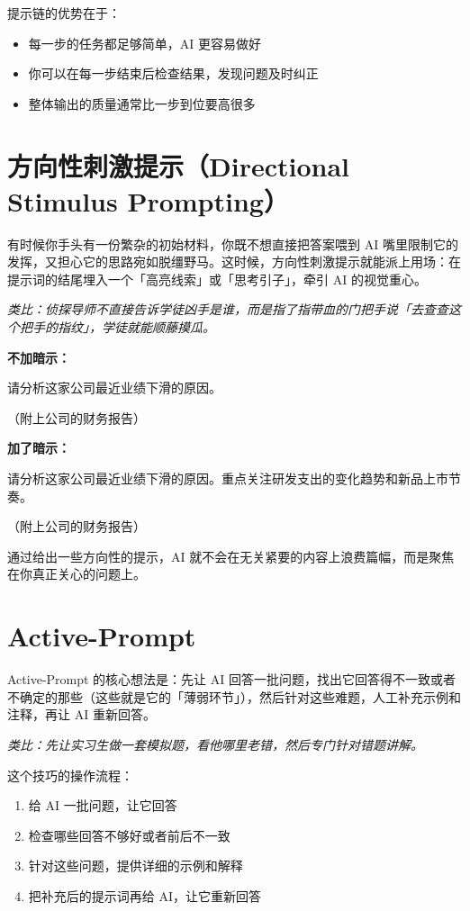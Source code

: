 提示链的优势在于：

\begin{itemize}
  \item 每一步的任务都足够简单，AI 更容易做好
  \item 你可以在每一步结束后检查结果，发现问题及时纠正
  \item 整体输出的质量通常比一步到位要高很多
\end{itemize}

\section{方向性刺激提示（Directional Stimulus Prompting）}

有时候你手头有一份繁杂的初始材料，你既不想直接把答案喂到 AI 嘴里限制它的发挥，又担心它的思路宛如脱缰野马。这时候，方向性刺激提示就能派上用场：在提示词的结尾埋入一个「高亮线索」或「思考引子」，牵引 AI 的视觉重心。

\textit{类比：侦探导师不直接告诉学徒凶手是谁，而是指了指带血的门把手说「去查查这个把手的指纹」，学徒就能顺藤摸瓜。}

\textbf{不加暗示：}
\begin{promptbox}
请分析这家公司最近业绩下滑的原因。

（附上公司的财务报告）
\end{promptbox}

\textbf{加了暗示：}
\begin{promptbox}
请分析这家公司最近业绩下滑的原因。重点关注研发支出的变化趋势和新品上市节奏。

（附上公司的财务报告）
\end{promptbox}

通过给出一些方向性的提示，AI 就不会在无关紧要的内容上浪费篇幅，而是聚焦在你真正关心的问题上。

\section{Active-Prompt}

Active-Prompt 的核心想法是：先让 AI 回答一批问题，找出它回答得不一致或者不确定的那些（这些就是它的「薄弱环节」），然后针对这些难题，人工补充示例和注释，再让 AI 重新回答。

\textit{类比：先让实习生做一套模拟题，看他哪里老错，然后专门针对错题讲解。}

这个技巧的操作流程：

\begin{enumerate}
  \item 给 AI 一批问题，让它回答
  \item 检查哪些回答不够好或者前后不一致
  \item 针对这些问题，提供详细的示例和解释
  \item 把补充后的提示词再给 AI，让它重新回答
\end{enumerate}

